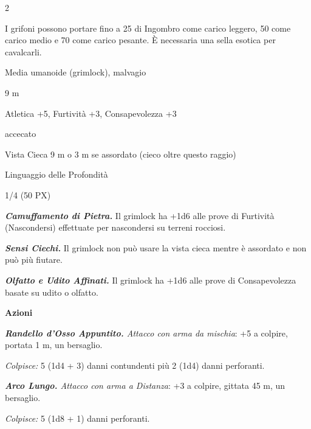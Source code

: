 \begin{multicols}{2}
{I grifoni possono portare fino a 25 di Ingombro come carico leggero, 50 come carico medio e 70 come carico pesante. È necessaria una sella esotica per cavalcarli.

\begin{description}[noitemsep, topsep=0pt, parsep=0pt, partopsep=0pt, itemsep=1pt, leftmargin=2.35cm,  labelwidth=2.2cm, itemindent=0cm, listparindent=0pt] %
\setlength{\baselineskip}{10pt}
\item[\textbf{Taglia/Tipo}] Media umanoide (grimlock), malvagio
\item[\textbf{Caratt.}] 
\item[\textbf{Punti Ferita}] 
\item[\textbf{Movimento}] 9 m
\item[\textbf{Tiri Salvez.}] 
\item[\textbf{Comp.}] Atletica +5, Furtività +3, Consapevolezza +3
\item[\textbf{Immunità}] accecato
\item[\textbf{Sensi}] Vista Cieca 9 m o 3 m se assordato (cieco oltre questo raggio)
\item[\textbf{Linguaggi}] Linguaggio delle Profondità
\item[\textbf{Sfida}] 1/4 (50 PX)
\end{description}
\smallskip

\emph{\textbf{Camuffamento di Pietra.}} Il grimlock ha +1d6 alle prove di Furtività (Nascondersi) effettuate per nascondersi su terreni rocciosi.

\emph{\textbf{Sensi Ciechi.}} Il grimlock non può usare la vista cieca mentre è assordato e non può più fiutare.

\emph{\textbf{Olfatto e Udito Affinati.}} Il grimlock ha +1d6 alle prove di Consapevolezza basate su udito o olfatto.

\textbf{Azioni}

\emph{\textbf{Randello d'Osso Appuntito.} Attacco con arma da mischia}: +5 a colpire, portata 1 m, un bersaglio.

\emph{Colpisce:} 5 (1d4 + 3) danni contundenti più 2 (1d4) danni perforanti.

\emph{\textbf{Arco Lungo.} Attacco con arma a Distanza}: +3 a colpire, gittata 45 m, un bersaglio.

\emph{Colpisce:} 5 (1d8 + 1) danni perforanti.

}
\end{multicols}
